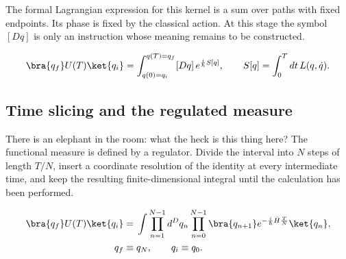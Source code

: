 The formal Lagrangian expression for this kernel is a sum over paths with fixed
endpoints.  Its phase is fixed by the classical action.  At this stage the
symbol $[Dq]$ is only an instruction whose meaning remains to be constructed.

\begin{equation}
  \bra{q_f}U(T)\ket{q_i}
  =\int_{q(0)=q_i}^{q(T)=q_f}[Dq]\,
  e^{\frac{i}{\hbar}S[q]},
  \qquad
  S[q]=\int_0^Tdt\,L(q,\dot q).
  \label{eq:proposal-formal-kernel}
\end{equation}


\subsection{Time slicing and the regulated measure}

There is an elephant in the room: what the heck is this thing here?  The
functional measure is defined by a regulator.  Divide the interval into $N$
steps of length $T/N$, insert a coordinate resolution of the identity at every
intermediate time, and keep the resulting finite-dimensional integral until
the calculation has been performed.

\begin{align}
  \bra{q_f}U(T)\ket{q_i}
  &={}
  \int\prod_{n=1}^{N-1}d^Dq_n
  \prod_{n=0}^{N-1}
  \bra{q_{n+1}}
  e^{-\frac{i}{\hbar}\hat H\frac{T}{N}}
  \ket{q_n},
  \label{eq:proposal-coordinate-slicing}\\
  q_f&\equiv q_N,
  \qquad q_i\equiv q_0.
\end{align}

